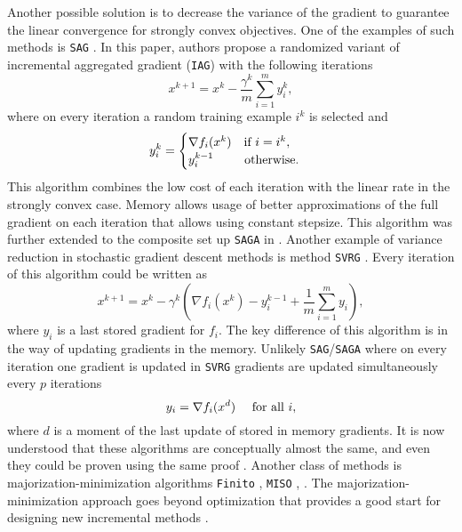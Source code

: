 Another possible solution is to decrease the variance of the gradient to guarantee the linear convergence for strongly convex objectives. One of the examples of such methods is \texttt{SAG} \cite{schmidt2017minimizing}. In this paper, authors propose a randomized variant of incremental aggregated gradient (\texttt{IAG}) \cite{blatt2007convergent} with the following iterations
$$
x^{k+1} = x^k - \frac{\gamma^k}{m}\sum_{i=1}^m y_i^k,
$$
where on every iteration a random training example $i^k$ is selected and 
$$
y_i^k = \begin{cases} \nabla f_i(x^k)~~~\textnormal{if }i = i^k,\\y_i^{k-1}~~~~~~~\,\textnormal{otherwise.}\end{cases}
$$
This algorithm combines the low cost of each iteration with the linear rate in the strongly convex case.
Memory allows usage of better approximations of the full gradient on each iteration that allows using constant stepsize. This algorithm was further extended to the composite set up \texttt{SAGA} in \cite{defazio2014saga}. Another example of variance reduction in stochastic gradient descent methods is method \texttt{SVRG} \cite{johnson2013accelerating}. Every iteration of this algorithm could be written as
$$
x^{k+1} = x^k -\gamma^k\left(\nabla f_i(x^k) - y_i^{k-1} + \frac{1}{m}\sum_{i=1}^m y_i\right),
$$
where $y_i$ is a last stored gradient for $f_i$. The key difference of this algorithm is in the way of updating gradients in the memory. Unlikely \texttt{SAG}/\texttt{SAGA} where on every iteration one gradient is updated in \texttt{SVRG} gradients are updated simultaneously every $p$ iterations
$$
y_i = \nabla f_i(x^d)~~~~\textnormal{for all }i,
$$
where $d$ is a moment of the last update of stored in memory gradients. It is now understood that these algorithms are conceptually almost the same, and even they could be proven using the same proof \cite{kovalev2019don, hofmann2015variance}. Another class of methods is majorization-minimization algorithms \texttt{Finito} \cite{defazio2014finito}, \texttt{MISO} \cite{mairal2015incremental}, \daveR \cite{mishchenko2018}. The majorization-minimization approach goes beyond optimization that provides a good start for designing new incremental methods \cite{qian2019miso}.